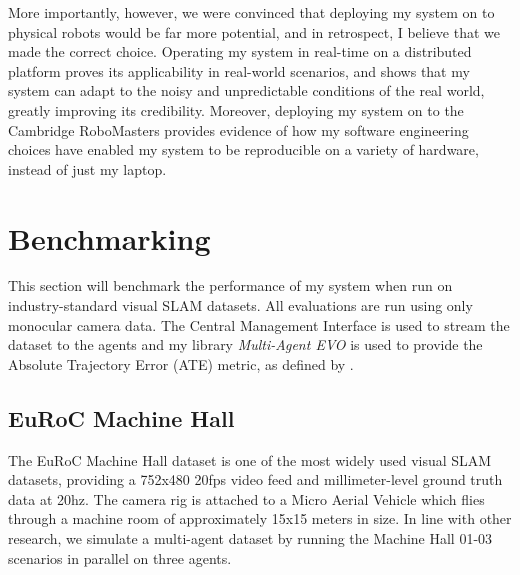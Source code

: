
More importantly, however, we were convinced that deploying my system on to physical robots would be far more potential, and in retrospect, I believe that we made the correct choice. Operating my system in real-time on a distributed platform proves its applicability in real-world scenarios, and shows that my system can adapt to the noisy and unpredictable conditions of the real world, greatly improving its credibility. Moreover, deploying my system on to the Cambridge RoboMasters provides evidence of how my software engineering choices have enabled my system to be reproducible on a variety of hardware, instead of just my laptop.

\section{Benchmarking}
\label{sec:benchmarking}
This section will benchmark the performance of my system when run on industry-standard visual SLAM datasets. All evaluations are run using only monocular camera data. The Central Management Interface is used to stream the dataset to the agents and my library \textit{Multi-Agent EVO} is used to provide the Absolute Trajectory Error (ATE) metric, as defined by \autocite{6385773}.

\subsection{EuRoC Machine Hall}
\label{sec:euroc-machine-hall}
The EuRoC Machine Hall dataset \autocite{burri2016euroc} is one of the most widely used visual SLAM datasets, providing a 752x480 20fps video feed and millimeter-level ground truth data at 20hz. The camera rig is attached to a Micro Aerial Vehicle which flies through a machine room of approximately 15x15 meters in size. In line with other research, we simulate a multi-agent dataset by running the Machine Hall 01-03 scenarios in parallel on three agents.

